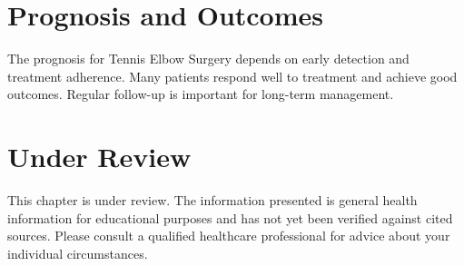 \section*{Prognosis and Outcomes}
The prognosis for Tennis Elbow Surgery depends on early detection and treatment adherence. Many patients respond well to treatment and achieve good outcomes. Regular follow-up is important for long-term management.
\section*{Under Review}
This chapter is under review. The information presented is general health information for educational purposes and has not yet been verified against cited sources. Please consult a qualified healthcare professional for advice about your individual circumstances.


\clearpage
